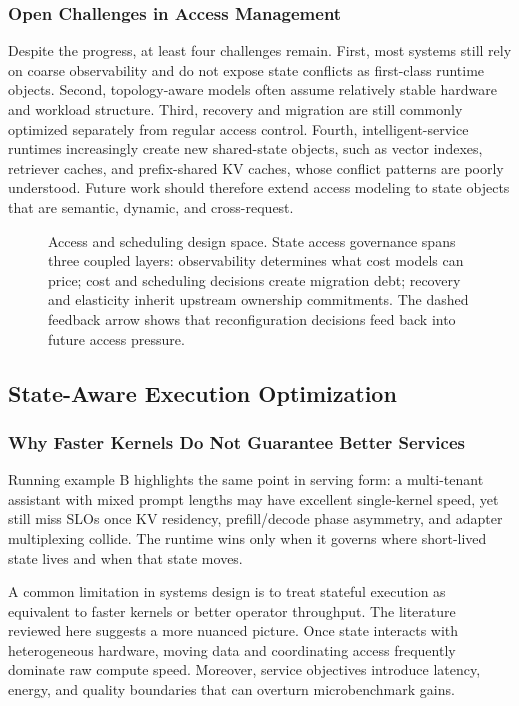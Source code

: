 \documentclass[acmsmall,screen,review]{acmart}
\begin{document}
\subsubsection{Open Challenges in Access Management}

Despite the progress, at least four challenges remain. First, most systems still rely on coarse observability and do not expose state conflicts as first-class runtime objects. Second, topology-aware models often assume relatively stable hardware and workload structure. Third, recovery and migration are still commonly optimized separately from regular access control. Fourth, intelligent-service runtimes increasingly create new shared-state objects, such as vector indexes, retriever caches, and prefix-shared KV caches, whose conflict patterns are poorly understood. Future work should therefore extend access modeling to state objects that are semantic, dynamic, and cross-request.

\begin{figure}[t]
\centering
\resizebox{0.94\textwidth}{!}{}
\caption{Access and scheduling design space. State access governance spans three coupled layers: observability determines what cost models can price; cost and scheduling decisions create migration debt; recovery and elasticity inherit upstream ownership commitments. The dashed feedback arrow shows that reconfiguration decisions feed back into future access pressure.}
\label{fig:access-designspace}
\end{figure}

\subsection{State-Aware Execution Optimization}

\subsubsection{Why Faster Kernels Do Not Guarantee Better Services}

Running example B highlights the same point in serving form: a multi-tenant assistant with mixed prompt lengths may have excellent single-kernel speed, yet still miss SLOs once KV residency, prefill/decode phase asymmetry, and adapter multiplexing collide. The runtime wins only when it governs where short-lived state lives and when that state moves.

A common limitation in systems design is to treat stateful execution as equivalent to faster kernels or better operator throughput. The literature reviewed here suggests a more nuanced picture. Once state interacts with heterogeneous hardware, moving data and coordinating access frequently dominate raw compute speed. Moreover, service objectives introduce latency, energy, and quality boundaries that can overturn microbenchmark gains.
\end{document}
